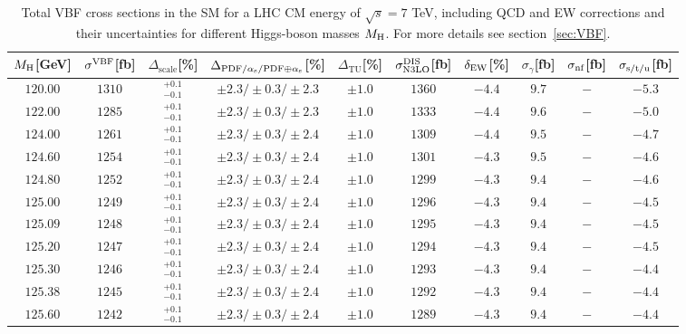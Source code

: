 \begin{table}[ht!]
\caption{Total VBF cross sections in the SM for a LHC CM energy of $\sqrt{s}=7$ TeV, including QCD and EW corrections
and their uncertainties for different Higgs-boson masses $M_\mathrm{H}$. For more details see section~\ref{sec:VBF}.}
\label{tab:vbf_XStot_7}
\begin{center}%
\begin{small}%
\begin{tabular}{cccccccc|cc}%
\toprule
$M_\mathrm{H}$[GeV] & $\sigma^{\mathrm{VBF}}$[fb] & $\Delta_{\mathrm{scale}}$[\%] & $\Delta_{\mathrm{PDF}/\alpha_{\mathrm{s}}/\mathrm{PDF\oplus\alpha_{\mathrm{s}}}}$[\%] & $\Delta_{\mathrm{TU}}$[\%] &
$\sigma_{\mathrm{N3LO}}^{\mathrm{DIS}}$[fb] & $\delta_{\mathrm{EW}}$[\%] & $\sigma_{\gamma}$[fb] & $\sigma_{\mbox{\scriptsize nf}}$[fb] & $\sigma_{\mbox{\scriptsize s/t/u}}$[fb]
\\
\midrule
$120.00$ & $1310$ & $^{+0.1}_{-0.1}$ & $\pm 2.3/\pm 0.3/\pm 2.3$ & $\pm 1.0$ & $1360$ & $-4.4$ & $9.7$ & $-$ & $-5.3$ \\
$122.00$ & $1285$ & $^{+0.1}_{-0.1}$ & $\pm 2.3/\pm 0.3/\pm 2.3$ & $\pm 1.0$ & $1333$ & $-4.4$ & $9.6$ & $-$ & $-5.0$ \\
$124.00$ & $1261$ & $^{+0.1}_{-0.1}$ & $\pm 2.3/\pm 0.3/\pm 2.4$ & $\pm 1.0$ & $1309$ & $-4.4$ & $9.5$ & $-$ & $-4.7$ \\
$124.60$ & $1254$ & $^{+0.1}_{-0.1}$ & $\pm 2.3/\pm 0.3/\pm 2.4$ & $\pm 1.0$ & $1301$ & $-4.3$ & $9.5$ & $-$ & $-4.6$ \\
$124.80$ & $1252$ & $^{+0.1}_{-0.1}$ & $\pm 2.3/\pm 0.3/\pm 2.4$ & $\pm 1.0$ & $1299$ & $-4.3$ & $9.4$ & $-$ & $-4.6$ \\
$125.00$ & $1249$ & $^{+0.1}_{-0.1}$ & $\pm 2.3/\pm 0.3/\pm 2.4$ & $\pm 1.0$ & $1296$ & $-4.3$ & $9.4$ & $-$ & $-4.5$ \\
$125.09$ & $1248$ & $^{+0.1}_{-0.1}$ & $\pm 2.3/\pm 0.3/\pm 2.4$ & $\pm 1.0$ & $1295$ & $-4.3$ & $9.4$ & $-$ & $-4.5$ \\
$125.20$ & $1247$ & $^{+0.1}_{-0.1}$ & $\pm 2.3/\pm 0.3/\pm 2.4$ & $\pm 1.0$ & $1294$ & $-4.3$ & $9.4$ & $-$ & $-4.5$ \\
$125.30$ & $1246$ & $^{+0.1}_{-0.1}$ & $\pm 2.3/\pm 0.3/\pm 2.4$ & $\pm 1.0$ & $1293$ & $-4.3$ & $9.4$ & $-$ & $-4.4$ \\
$125.38$ & $1245$ & $^{+0.1}_{-0.1}$ & $\pm 2.3/\pm 0.3/\pm 2.4$ & $\pm 1.0$ & $1292$ & $-4.3$ & $9.4$ & $-$ & $-4.4$ \\
$125.60$ & $1242$ & $^{+0.1}_{-0.1}$ & $\pm 2.3/\pm 0.3/\pm 2.4$ & $\pm 1.0$ & $1289$ & $-4.3$ & $9.4$ & $-$ & $-4.4$ \\

\end{tabular}
\end{small}
\end{center}
\end{table}

